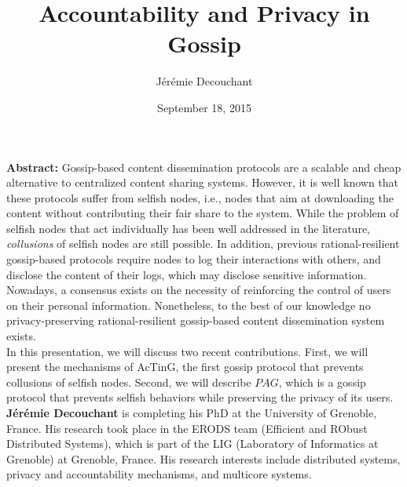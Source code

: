 \documentclass[12pt]{article}
\title{Accountability and Privacy in Gossip}
\author{Jérémie Decouchant}
\date{September 18, 2015}
\begin{document}
\maketitle

\textbf{Abstract:} Gossip-based content dissemination protocols are a scalable and cheap 
alternative to centralized content sharing systems. However, it is well known 
that these protocols suffer from selfish nodes, i.e., nodes that aim at 
downloading the content without contributing their fair share to the system. 
While the problem of selfish nodes that act individually has been well 
addressed in the literature, \textit{collusions} of selfish nodes are still possible. In addition, previous rational-resilient gossip-based protocols require nodes to log their interactions with others, and disclose the content of their logs, which may disclose sensitive information. Nowadays, a consensus exists on the necessity of reinforcing the control of users on their personal information. Nonetheless, to the best of our knowledge no privacy-preserving rational-resilient gossip-based content dissemination system exists.\\
In this presentation, we will discuss two recent contributions. First, we will present the mechanisms of AcTinG, the first gossip protocol that prevents collusions of selfish nodes. Second, we will describe $PAG$, which is a gossip protocol that prevents selfish behaviors while preserving the privacy of its users. \\

\textbf{Jérémie Decouchant} is completing his PhD at the University of Grenoble, France. His research took place in the ERODS team (Efficient and RObust Distributed Systems), which is part of the LIG (Laboratory of Informatics at Grenoble) at Grenoble, France. His research interests include distributed systems, privacy and accountability mechanisms, and multicore systems. 
\end{document}
